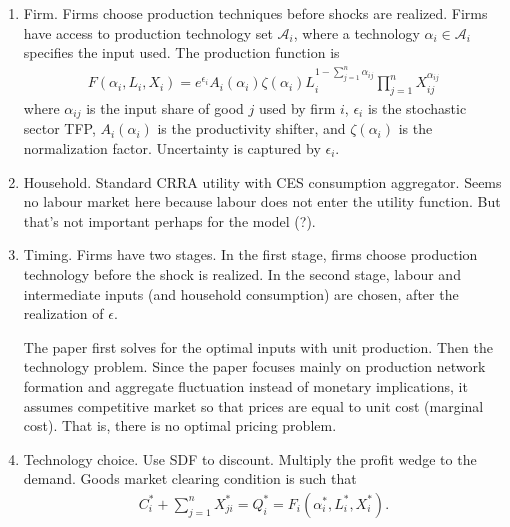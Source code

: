 \documentclass[12pt]{article}
\numberwithin{equation}{section}
\begin{document}
\begin{enumerate}
    \item Firm. Firms choose production techniques before shocks are realized. Firms have access to production technology set $\mathcal{A}_i$, where a technology $\alpha_i \in \mathcal{A}_i$ specifies the input used. The production function is
    \begin{align*}
        F(\alpha_i, L_i, X_i) = e^{\epsilon_i}A_i(\alpha_i)\zeta(\alpha_i)L_i^{1-\sum_{j=1}^n \alpha_{ij}}\prod_{j=1}^n X_{ij}^{\alpha_{ij}}
    \end{align*}
    where $\alpha_{ij}$ is the input share of good $j$ used by firm $i$, $\epsilon_i$ is the stochastic sector TFP, $A_i(\alpha_i)$ is the productivity shifter, and $\zeta(\alpha_i)$ is the normalization factor. Uncertainty is captured by $\epsilon_i$.
    \item Household. Standard CRRA utility with CES consumption aggregator. Seems no labour market here because labour does not enter the utility function. But that's not important perhaps for the model (?).
    \item Timing. Firms have two stages. In the first stage, firms choose production technology before the shock is realized. In the second stage, labour and intermediate inputs (and household consumption) are chosen, after the realization of $\epsilon$.
    
    The paper first solves for the optimal inputs with unit production. Then the technology problem. Since the paper focuses mainly on production network formation and aggregate fluctuation instead of monetary implications, it assumes competitive market so that prices are equal to unit cost (marginal cost). That is, there is no optimal pricing problem.
    \item Technology choice. Use SDF to discount. Multiply the profit wedge to the demand. Goods market clearing condition is such that
    \begin{align}
        C_i^* + \sum_{j=1}^n X_{ji}^* = Q_i^* = F_i(\alpha_i^*, L_i^*, X_i^*).
    \end{align}
\end{enumerate}




\end{document}
